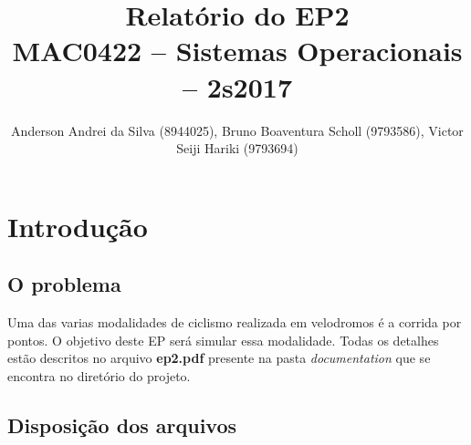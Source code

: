 \documentclass[12pt,a4paper]{article}
\title{Relatório do EP2\\MAC0422 -- Sistemas Operacionais -- 2s2017}
\author{Anderson Andrei da Silva (8944025), Bruno Boaventura Scholl (9793586), Victor Seiji Hariki (9793694)}
\date{}
\begin{document}
\maketitle

\section{Introdução}

\subsection{O problema}

     Uma das varias modalidades de ciclismo realizada em velodromos é a corrida por pontos. O objetivo deste EP será simular essa modalidade. Todas os detalhes estão descritos no arquivo \textbf{ep2.pdf} presente na pasta \textit{documentation} que se encontra no diretório do projeto.

\subsection{Disposição dos arquivos} 
\end{document}
